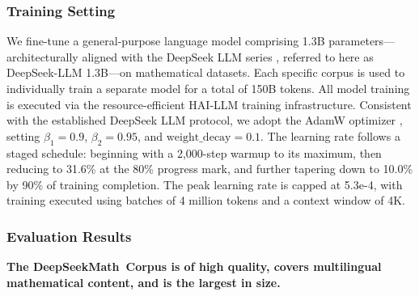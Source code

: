 \begin{itemize}[topsep=0pt]
\subsubsection{Training Setting}
\label{sec:quality-policy}
We fine-tune a general-purpose language model comprising 1.3B parameters—architecturally aligned with the DeepSeek LLM series \citep{deepseek-llm}, referred to here as DeepSeek-LLM 1.3B—on mathematical datasets. Each specific corpus is used to individually train a separate model for a total of 150B tokens. All model training is executed via the resource-efficient HAI-LLM \citep{haillm} training infrastructure. Consistent with the established DeepSeek LLM protocol, we adopt the AdamW optimizer \citep{adamW}, setting $\beta_1=0.9$, $\beta_2=0.95$, and $\mathrm{weight\_decay}=0.1$. The learning rate follows a staged schedule: beginning with a 2,000-step warmup to its maximum, then reducing to 31.6\% at the 80\% progress mark, and further tapering down to 10.0\% by 90\% of training completion. The peak learning rate is capped at 5.3e-4, with training executed using batches of 4 million tokens and a context window of 4K.

\subsubsection{Evaluation Results}

\textbf{The DeepSeekMath~Corpus is of high quality, covers multilingual mathematical content, and is the largest in size.}


\end{itemize}
